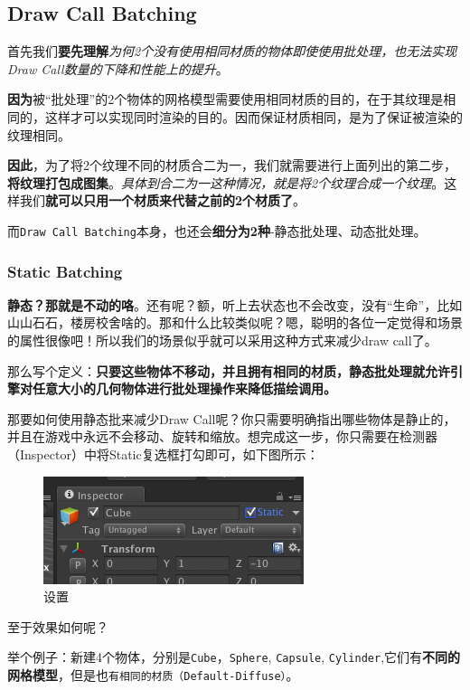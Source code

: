 \documentclass[UTF8,a4paper,12pt]{ctexart}
\begin{document}
	  	\subsection{Draw Call Batching}
	  		首先我们\textbf{要先理解}\textit{为何2个没有使用相同材质的物体即使使用批处理，也无法实现Draw Call数量的下降和性能上的提升}。
	  		
	  		\textbf{因为}被“批处理”的2个物体的网格模型需要使用相同材质的目的，在于其纹理是相同的，这样才可以实现同时渲染的目的。因而保证材质相同，是为了保证被渲染的纹理相同。
	  		
	  		\textbf{因此}，为了将2个纹理不同的材质合二为一，我们就需要进行上面列出的第二步，\textbf{将纹理打包成图集}。\textit{具体到合二为一这种情况，就是将2个纹理合成一个纹理}。这样我们\textbf{就可以只用一个材质来代替之前的2个材质了}。
	  		
	  		而\verb|Draw Call Batching|本身，也还会\textbf{细分为2种}-静态批处理、动态批处理。
	  		
			  	\subsubsection*{Static Batching}
			  		\textbf{静态？那就是不动的咯}。还有呢？额，听上去状态也不会改变，没有“生命”，比如山山石石，楼房校舍啥的。那和什么比较类似呢？嗯，聪明的各位一定觉得和场景的属性很像吧！所以我们的场景似乎就可以采用这种方式来减少draw call了。
			  		
			  		那么写个定义：\textbf{只要这些物体不移动，并且拥有相同的材质，静态批处理就允许引擎对任意大小的几何物体进行批处理操作来降低描绘调用。}
			  		
			  		那要如何使用静态批来减少Draw Call呢？你只需要明确指出哪些物体是静止的，并且在游戏中永远不会移动、旋转和缩放。想完成这一步，你只需要在检测器（Inspector）中将Static复选框打勾即可，如下图所示：
			  			\begin{figure}[H]
			  				\centering
			  				\includegraphics[scale=1]{beforeStaticBatching.png}
			  				\caption{设置}
			  			\end{figure}
		  			
		  			至于效果如何呢？
		  			
		  			举个例子：新建4个物体，分别是\verb|Cube|，\verb|Sphere|, \verb|Capsule|, \verb|Cylinder|,它们有\textbf{不同的网格模型}，但是也\verb|有相同的材质（Default-Diffuse）|。
		  			
\end{document}
